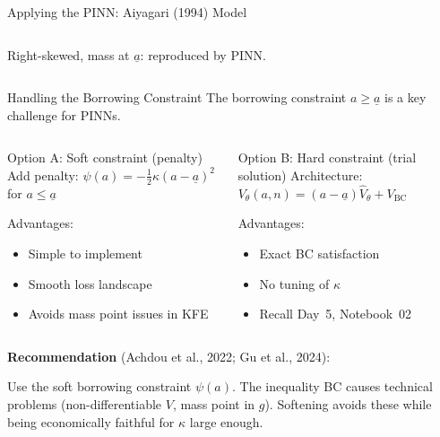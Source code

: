 \documentclass[aspectratio=169,11pt]{beamer}
\newcommand{\emphc}[1]{\textcolor{harvardcrimson}{#1}}
\newcommand{\ubar}[1]{\underline{#1}}
\begin{document}
\begin{frame}[shrink=15]{Applying the PINN: Aiyagari (1994) Model}
\begin{columns}[T]
{\small Right-skewed, mass at $\ubar{a}$: reproduced by PINN.}
\end{columns}
\end{frame}

\begin{frame}{Handling the Borrowing Constraint}
\small
The borrowing constraint $a \geq \ubar{a}$ is a key challenge for PINNs.

\vspace{0.1em}
\begin{columns}[T]
\begin{block}{Option A: Soft constraint (penalty)}
\footnotesize
Add penalty: $\psi(a) = -\tfrac{1}{2}\kappa(a - \ubar{a})^2$ for $a \leq \ubar{a}$

\vspace{0.1em}
Advantages:
\begin{itemize}\itemsep0pt
    \item Simple to implement
    \item Smooth loss landscape
    \item Avoids mass point issues in KFE
\end{itemize}
\end{block}

\begin{block}{Option B: Hard constraint (trial solution)}
\footnotesize
Architecture: $V_\theta(a,n) = (a - \ubar{a})\hat{V}_\theta + V_{\text{BC}}$

\vspace{0.1em}
Advantages:
\begin{itemize}\itemsep0pt
    \item Exact BC satisfaction
    \item No tuning of $\kappa$
    \item Recall Day~5, Notebook~02
\end{itemize}
\end{block}
\end{columns}

\vspace{0.1em}
\textbf{Recommendation} (Achdou et al., 2022; Gu et al., 2024):
\begin{center}
\colorbox{uzhgreylight}{\parbox{0.8\textwidth}{\centering\footnotesize
Use the \emphc{soft borrowing constraint} $\psi(a)$. The inequality BC causes technical problems (non-differentiable $V$, mass point in $g$). Softening avoids these while being economically faithful for $\kappa$ large enough.}}
\end{center}
\end{frame}
\end{document}
